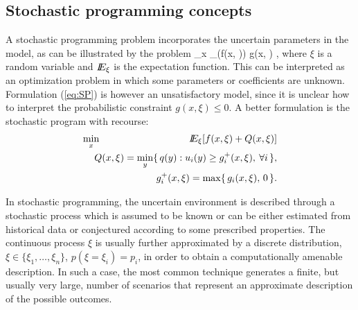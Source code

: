 %
%
\subsection{Stochastic programming concepts}

A stochastic programming problem incorporates the uncertain parameters
in the model, as can be illustrated by the problem
%
\be \label{eq:SP}
  \min_x \E_\xi(f(x, \xi)) \quad {}\; g(x, \xi) ,
\ee
%
where $\xi$ is a random variable and $I\!\!E_\xi$ is the expectation function.
This can be interpreted as an optimization
problem in which some parameters or coefficients are unknown.
Formulation (\ref{eq:SP}) is however an unsatisfactory model, since
it is unclear how to interpret the probabilistic constraint
$g(x,\xi) \le 0$. A better formulation is the stochastic program
with recourse:
%
\begin{eqnarray} \label{eq:SPRecourse}
\min_x \hspace{-1.5em} && \E_\xi[f(x, \xi) + Q(x, \xi)] \nonumber \\ 
  && Q(x,\xi) = \min_y \{\, q(y) : u_i(y) \ge g_i^+(x, \xi),\:\forall i \,\},\\
  && g_i^+(x, \xi) = \max \{\, g_i(x, \xi), \, 0 \,\}. \nonumber
\end{eqnarray}


In stochastic programming, the uncertain environment is 
described through a stochastic process which is assumed to be 
known or can be either estimated from historical data or 
conjectured according to some prescribed properties. The 
continuous process $\xi$ is usually further approximated by a discrete 
distribution, $\xi \in \{\xi_1, \ldots,\xi_n\}$, $p(\xi=\xi_i) = p_i$,
in order to obtain a computationally amenable description. 
%
In such a case, the most common technique generates a 
finite, but usually very large, number of scenarios that represent an 
approximate description of the possible outcomes.


